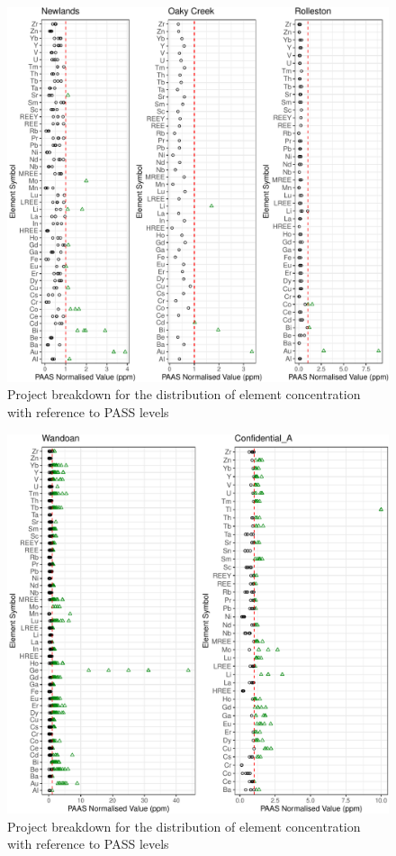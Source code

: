 \documentclass[11pt,a4paper,]{article}
\begin{document}
\newpage

\begin{figure}
\includegraphics[width=1\linewidth,height=1\textheight]{Final_report_files/figure-latex/regionalbk5-1} \caption{Project breakdown for the distribution of element concentration with reference to PASS levels}\label{fig:regionalbk5}
\end{figure}

\newpage

\begin{figure}
\includegraphics[width=1\linewidth,height=1\textheight]{Final_report_files/figure-latex/regionalbk6-1} \caption{Project breakdown for the distribution of element concentration with reference to PASS levels}\label{fig:regionalbk6}
\end{figure}

\newpage

\printbibliography[title=Reference]
\end{document}
